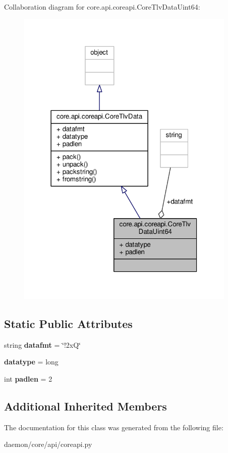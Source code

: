 Collaboration diagram for core.\+api.\+coreapi.\+Core\+Tlv\+Data\+Uint64\+:
\nopagebreak
\begin{figure}[H]
\begin{center}
\leavevmode
\includegraphics[width=297pt]{classcore_1_1api_1_1coreapi_1_1_core_tlv_data_uint64__coll__graph}
\end{center}
\end{figure}
\subsection*{Static Public Attributes}
\begin{DoxyCompactItemize}
\item 
\hypertarget{classcore_1_1api_1_1coreapi_1_1_core_tlv_data_uint64_ada981d40a5a7e0610260c249e4084b6f}{string {\bfseries datafmt} = \char`\"{}!2x\+Q\char`\"{}}\label{classcore_1_1api_1_1coreapi_1_1_core_tlv_data_uint64_ada981d40a5a7e0610260c249e4084b6f}

\item 
\hypertarget{classcore_1_1api_1_1coreapi_1_1_core_tlv_data_uint64_a81ff1967df45704ce2abbac318a2784a}{{\bfseries datatype} = long}\label{classcore_1_1api_1_1coreapi_1_1_core_tlv_data_uint64_a81ff1967df45704ce2abbac318a2784a}

\item 
\hypertarget{classcore_1_1api_1_1coreapi_1_1_core_tlv_data_uint64_adbaf9177365ed049c72c76881774dd9e}{int {\bfseries padlen} = 2}\label{classcore_1_1api_1_1coreapi_1_1_core_tlv_data_uint64_adbaf9177365ed049c72c76881774dd9e}

\end{DoxyCompactItemize}
\subsection*{Additional Inherited Members}


The documentation for this class was generated from the following file\+:\begin{DoxyCompactItemize}
\item 
daemon/core/api/coreapi.\+py\end{DoxyCompactItemize}
